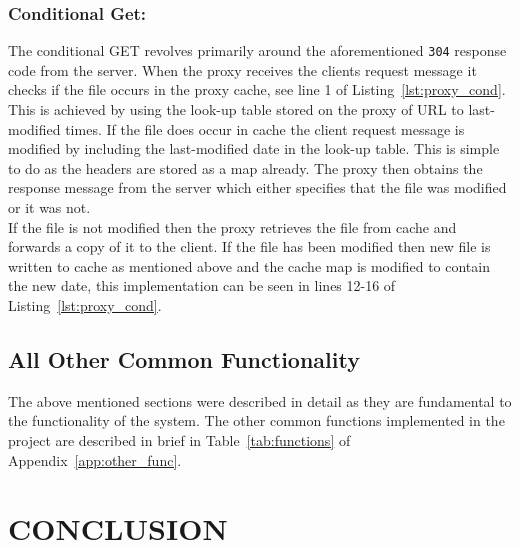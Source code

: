 \documentclass[10pt,twocolumn]{witseiepaper}
\begin{document}
		\subsubsection*{Conditional Get:} The conditional GET revolves primarily around the aforementioned \texttt{304} response code from the server. When the proxy receives the clients request message it checks if the file occurs in the proxy cache, see line 1 of Listing~\ref{lst:proxy_cond}. This is achieved by using the look-up table stored on the proxy of URL to last-modified times. If the file does occur in cache the client request message is modified by including the last-modified date in the look-up table. This is simple to do as the headers are stored as a map already. The proxy then obtains the response message from the server which either specifies that the file was modified or it was not. \\
		
		If the file is not modified then the proxy retrieves the file from cache and forwards a copy of it to the client. If the file has been modified then new file is written to cache as mentioned above and the cache map is modified to contain the new date, this implementation can be seen in lines 12-16 of Listing~\ref{lst:proxy_cond}. 
	
	\subsection{All Other Common Functionality}
	
		The above mentioned sections were described in detail as they are fundamental to the functionality of the system. The other common functions implemented in the project are described in brief in Table~\ref{tab:functions} of Appendix~\ref{app:other_func}.


\section{CONCLUSION}

\end{document}
